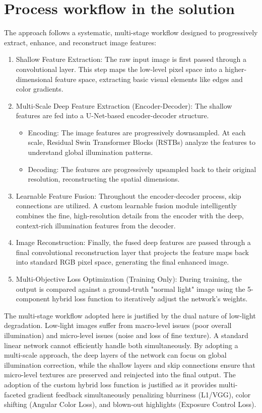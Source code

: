 \documentclass[12pt, a4paper]{report}
\begin{document}
\section{Process workflow in the solution}
The approach follows a systematic, multi-stage workflow designed to progressively extract, enhance, and reconstruct image features:
\begin{enumerate}
    \item Shallow Feature Extraction: The raw input image is first passed through a convolutional layer. This step maps the low-level pixel space into a higher-dimensional feature space, extracting basic visual elements like edges and color gradients.
    \item Multi-Scale Deep Feature Extraction (Encoder-Decoder): The shallow features are fed into a U-Net-based encoder-decoder structure.
    \begin{itemize}
        \item Encoding: The image features are progressively downsampled. At each scale, Residual Swin Transformer Blocks (RSTBs) analyze the features to understand global illumination patterns.
        \item Decoding: The features are progressively upsampled back to their original resolution, reconstructing the spatial dimensions.
    \end{itemize}
    \item Learnable Feature Fusion: Throughout the encoder-decoder process, skip connections are utilized. A custom learnable fusion module intelligently combines the fine, high-resolution details from the encoder with the deep, context-rich illumination features from the decoder.
    \item Image Reconstruction: Finally, the fused deep features are passed through a final convolutional reconstruction layer that projects the feature maps back into standard RGB pixel space, generating the final enhanced image.
    \item Multi-Objective Loss Optimization (Training Only): During training, the output is compared against a ground-truth "normal light" image using the 5-component hybrid loss function to iteratively adjust the network's weights.
\end{enumerate}

The multi-stage workflow adopted here is justified by the dual nature of low-light degradation. Low-light images suffer from macro-level issues (poor overall illumination) and micro-level issues (noise and loss of fine texture). A standard linear network cannot efficiently handle both simultaneously. By adopting a multi-scale approach, the deep layers of the network can focus on global illumination correction, while the shallow layers and skip connections ensure that micro-level textures are preserved and reinjected into the final output. The adoption of the custom hybrid loss function is justified as it provides multi-faceted gradient feedback simultaneously penalizing blurriness (L1/VGG), color shifting (Angular Color Loss), and blown-out highlights (Exposure Control Loss).
\end{document}
